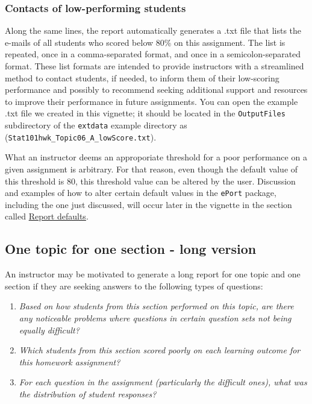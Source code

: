 \documentclass{article}\usepackage[]{graphicx}\usepackage[]{color}
\numberwithin{equation}{section} %
\begin{document}
\subsubsection{Contacts of low-performing students}
\label{sec:lowPerform}

Along the same lines, the report automatically generates a .txt file that lists the e-mails of all students who scored below 80\% on this assignment. The list is repeated, once in a comma-separated format, and once in a semicolon-separated format. These list formats are intended to provide instructors with a streamlined method to contact students, if needed, to inform them of their low-scoring performance and possibly to recommend seeking additional support and resources to improve their performance in future assignments. You can open the example .txt file we created in this vignette; it should be located in the \texttt{OutputFiles} subdirectory of the \texttt{extdata} example directory as (\texttt{Stat101hwk\_Topic06\_A\_lowScore.txt}).

What an instructor deems an approporiate threshold for a poor performance on a given assignment is arbitrary. For that reason, even though the default value of this threshold is 80, this threshold value can be altered by the user. Discussion and examples of how to alter certain default values in the \texttt{ePort} package, including the one just discussed, will occur later in the vignette in the section called \hyperref[sec:repOptions]{Report defaults}.

\subsection{One topic for one section - long version}

An instructor may be motivated to generate a long report for one topic and one section if they are seeking answers to the following types of questions:

\begin{enumerate}
\item \textit{Based on how students from this section performed on this topic, are there any noticeable problems where questions in certain question sets not being equally difficult?}
\item \textit{Which students from this section scored poorly on each learning outcome for this homework assignment?}
\item \textit{For each question in the assignment (particularly the difficult ones), what was the distribution of student responses?}
\end{enumerate}
\end{document}
